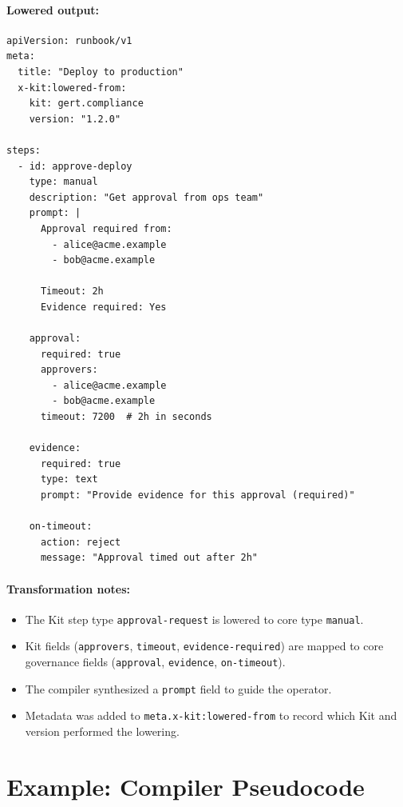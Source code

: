 \paragraph{Lowered output:}

\begin{verbatim}
apiVersion: runbook/v1
meta:
  title: "Deploy to production"
  x-kit:lowered-from:
    kit: gert.compliance
    version: "1.2.0"

steps:
  - id: approve-deploy
    type: manual
    description: "Get approval from ops team"
    prompt: |
      Approval required from:
        - alice@acme.example
        - bob@acme.example
      
      Timeout: 2h
      Evidence required: Yes
    
    approval:
      required: true
      approvers:
        - alice@acme.example
        - bob@acme.example
      timeout: 7200  # 2h in seconds
    
    evidence:
      required: true
      type: text
      prompt: "Provide evidence for this approval (required)"
    
    on-timeout:
      action: reject
      message: "Approval timed out after 2h"
\end{verbatim}

\paragraph{Transformation notes:}

\begin{itemize}
  \item The Kit step type \texttt{approval-request} is lowered to core type
    \texttt{manual}.
  \item Kit fields (\texttt{approvers}, \texttt{timeout},
    \texttt{evidence-required}) are mapped to core governance fields
    (\texttt{approval}, \texttt{evidence}, \texttt{on-timeout}).
  \item The compiler synthesized a \texttt{prompt} field to guide the operator.
  \item Metadata was added to \texttt{meta.x-kit:lowered-from} to record which
    Kit and version performed the lowering.
\end{itemize}

\section{Example: Compiler Pseudocode}
\label{sec:compiler-pseudocode}


